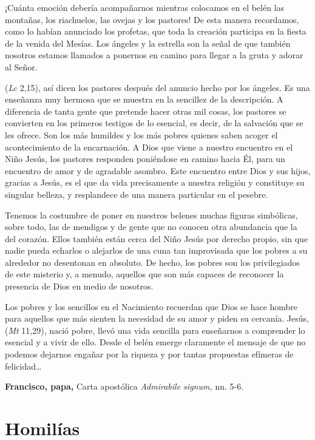 ¡Cuánta emoción debería acompañarnos mientras colocamos en el belén las montañas, los riachuelos, las ovejas y los pastores! De esta manera recordamos, como lo habían anunciado los profetas, que toda la creación participa en la fiesta de la venida del Mesías. Los ángeles y la estrella son la señal de que también nosotros estamos llamados a ponernos en camino para llegar a la gruta y adorar al Señor.

 (\emph{Lc} 2,15), así dicen los pastores después del anuncio hecho por los ángeles. Es una enseñanza muy hermosa que se muestra en la sencillez de la descripción. A diferencia de tanta gente que pretende hacer otras mil cosas, los pastores se convierten en los primeros testigos de lo esencial, es decir, de la salvación que se les ofrece. Son los más humildes y los más pobres quienes saben acoger el acontecimiento de la encarnación. A Dios que viene a nuestro encuentro en el Niño Jesús, los pastores responden poniéndose en camino hacia Él, para un encuentro de amor y de agradable asombro. Este encuentro entre Dios y sus hijos, gracias a Jesús, es el que da vida precisamente a nuestra religión y constituye su singular belleza, y resplandece de una manera particular en el pesebre.

Tenemos la costumbre de poner en nuestros belenes muchas figuras simbólicas, sobre todo, las de mendigos y de gente que no conocen otra abundancia que la del corazón. Ellos también están cerca del Niño Jesús por derecho propio, sin que nadie pueda echarlos o alejarlos de una cuna tan improvisada que los pobres a su alrededor no desentonan en absoluto. De hecho, los pobres son los privilegiados de este misterio y, a menudo, aquellos que son más capaces de reconocer la presencia de Dios en medio de nosotros.

Los pobres y los sencillos en el Nacimiento recuerdan que Dios se hace hombre para aquellos que más sienten la necesidad de su amor y piden su cercanía. Jesús,  (\emph{Mt} 11,29), nació pobre, llevó una vida sencilla para enseñarnos a comprender lo esencial y a vivir de ello. Desde el belén emerge claramente el mensaje de que no podemos dejarnos engañar por la riqueza y por tantas propuestas efímeras de felicidad\ldots{}

\textbf{Francisco, papa,} Carta apostólica \emph{Admirabile signum,} nn. 5-6.

\section{Homilías}

